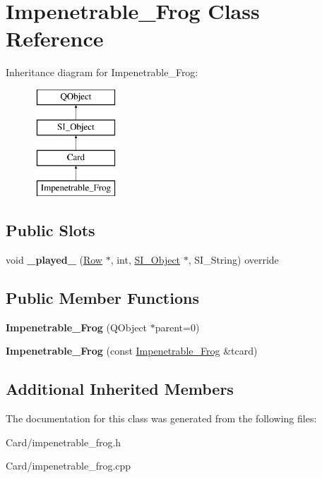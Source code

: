 \hypertarget{class_impenetrable___frog}{}\section{Impenetrable\+\_\+\+Frog Class Reference}
\label{class_impenetrable___frog}
Inheritance diagram for Impenetrable\+\_\+\+Frog\+:\begin{figure}[H]
\begin{center}
\leavevmode
\includegraphics[height=4.000000cm]{class_impenetrable___frog}
\end{center}
\end{figure}
\subsection*{Public Slots}
\begin{DoxyCompactItemize}
\item 
\mbox{\label{class_impenetrable___frog_af11f41143faddbc22d56bb47c5fbd519}} 
void {\bfseries \+\_\+played\+\_\+} (\hyperlink{class_card_set}{Row} $\ast$, int, \hyperlink{class_s_i___object}{S\+I\+\_\+\+Object} $\ast$, S\+I\+\_\+\+String) override
\end{DoxyCompactItemize}
\subsection*{Public Member Functions}
\begin{DoxyCompactItemize}
\item 
\mbox{\label{class_impenetrable___frog_a9abba6e7016ea694d45e5dc2404baf21}} 
{\bfseries Impenetrable\+\_\+\+Frog} (Q\+Object $\ast$parent=0)
\item 
\mbox{\label{class_impenetrable___frog_a1bb495260d745f935cf25ef1bfd1fdc3}} 
{\bfseries Impenetrable\+\_\+\+Frog} (const \hyperlink{class_impenetrable___frog}{Impenetrable\+\_\+\+Frog} \&tcard)
\end{DoxyCompactItemize}
\subsection*{Additional Inherited Members}


The documentation for this class was generated from the following files\+:\begin{DoxyCompactItemize}
\item 
Card/impenetrable\+\_\+frog.\+h\item 
Card/impenetrable\+\_\+frog.\+cpp\end{DoxyCompactItemize}
